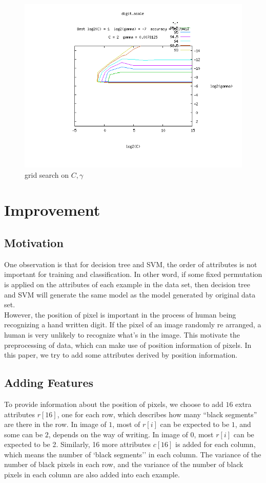 \documentclass[a4paper,11pt]{article}
\begin{document}
\begin{figure}
\centering
\includegraphics[width=1.0\textwidth]{digit}
\caption{grid search on $C,\gamma$}
\end{figure}

\section{Improvement}
\subsection{Motivation}
One observation is that for decision tree and SVM, the order of attributes is not important for training and classification. In other word, if some fixed permutation is applied on the attributes of each example in the data set, then decision tree and SVM will generate the same model as the model generated by original data set.\\
However, the position of pixel is important in the process of human being recognizing a hand written digit. If the pixel of an image randomly re arranged, a human is very unlikely to recognize what's in the image. This motivate the preprocessing of data, which can make use of position information of pixels. In this paper, we try to add some attributes derived by position information.
\subsection{Adding Features}
To provide information about the position of pixels, we choose to add $16$ extra attributes $r[16]$, one for each row, which describes how many ``black segments'' are there in the row. In image of $1$, most of $r[i]$ can be expected to be $1$, and some can be $2$, depends on the way of writing. In image of 0, most $r[i]$ can be expected to be 2.
Similarly, 16 more attributes $c[16]$ is added for each column, which means the number of `black segments'' in each column.
The variance of the number of black pixels in each row, and the variance of the number of black pixels in each column are also added into each example.
\end{document}
